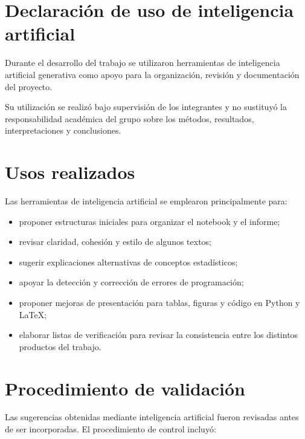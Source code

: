 \section{Declaración de uso de inteligencia artificial}
\label{anexo:uso-ia}

Durante el desarrollo del trabajo se utilizaron herramientas de
inteligencia artificial generativa como apoyo para la organización,
revisión y documentación del proyecto.

Su utilización se realizó bajo supervisión de los integrantes y no
sustituyó la responsabilidad académica del grupo sobre los métodos,
resultados, interpretaciones y conclusiones.

\section*{Usos realizados}

Las herramientas de inteligencia artificial se emplearon principalmente
para:

\begin{itemize}
    \item proponer estructuras iniciales para organizar el notebook y el
    informe;

    \item revisar claridad, cohesión y estilo de algunos textos;

    \item sugerir explicaciones alternativas de conceptos estadísticos;

    \item apoyar la detección y corrección de errores de programación;

    \item proponer mejoras de presentación para tablas, figuras y código
    en Python y \LaTeX;

    \item elaborar listas de verificación para revisar la consistencia
    entre los distintos productos del trabajo.
\end{itemize}

\section*{Procedimiento de validación}

Las sugerencias obtenidas mediante inteligencia artificial fueron
revisadas antes de ser incorporadas. El procedimiento de control incluyó:

